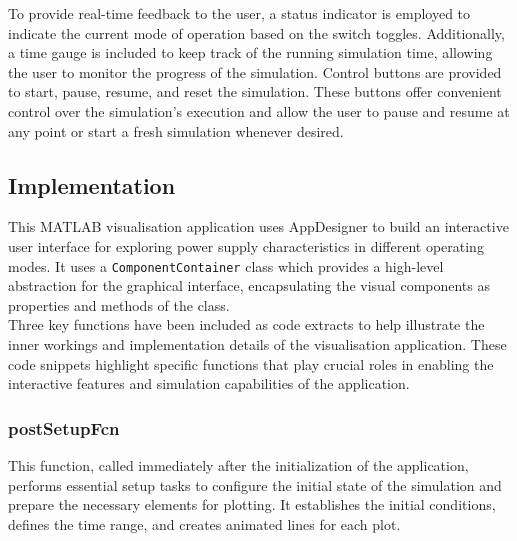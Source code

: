 \leavevmode\newline
To provide real-time feedback to the user, a status indicator is employed to indicate the current mode of operation based on the switch toggles. Additionally, a time gauge is included to keep track of the running simulation time, allowing the user to monitor the progress of the simulation. Control buttons are provided to start, pause, resume, and reset the simulation. These buttons offer convenient control over the simulation's execution and allow the user to pause and resume at any point or start a fresh simulation whenever desired.

\subsection{Implementation}
This MATLAB visualisation application uses AppDesigner to build an interactive user interface for exploring power supply characteristics in different operating modes. It uses a \texttt{ComponentContainer} class which provides a high-level abstraction for the graphical interface, encapsulating the visual components as properties and methods of the class.
\\

Three key functions have been included as code extracts to help illustrate the inner workings and implementation details of the visualisation application. These code snippets highlight specific functions that play crucial roles in enabling the interactive features and simulation capabilities of the application.

\subsubsection{postSetupFcn}
This function, called immediately after the initialization of the application, performs essential setup tasks to configure the initial state of the simulation and prepare the necessary elements for plotting. It establishes the initial conditions, defines the time range, and creates animated lines for each plot.

